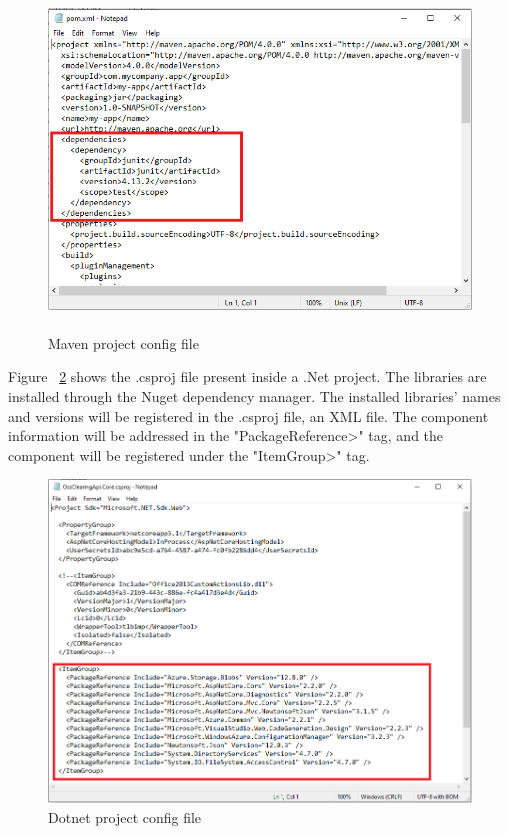 \begin{figure}[H]
	\includegraphics[width=15cm,height=9cm]{includes/pom.PNG}
	\centering
	\caption{Maven project config file}
	\label{fig:pom}
\end{figure}
Figure ~\ref{fig:dotnet} shows the .csproj file present inside a .Net project. The libraries are installed through the Nuget dependency manager. The installed libraries' names and versions will be registered in the .csproj file, an XML file. The component information will be addressed in the "PackageReference>" tag, and the component will be registered under the "ItemGroup>" tag.
\begin{figure}[H]
	\includegraphics[width=15cm]{includes/dotnet.PNG}
	\centering
	\caption{Dotnet project config file}
	\label{fig:dotnet}
\end{figure}

